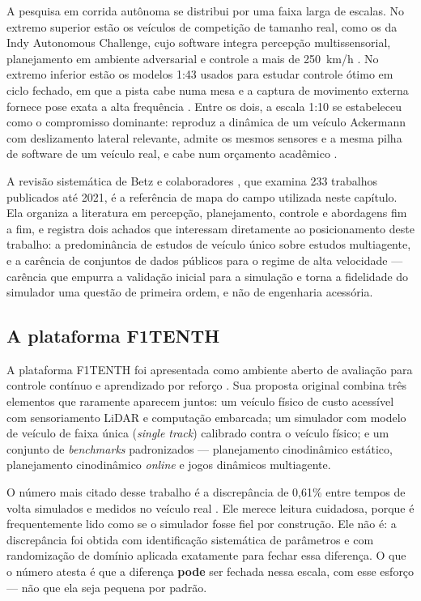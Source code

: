 A pesquisa em corrida autônoma se distribui por uma faixa larga de escalas. No
extremo superior estão os veículos de competição de tamanho real, como os da
Indy Autonomous Challenge, cujo software integra percepção multissensorial,
planejamento em ambiente adversarial e controle a mais de 250~km/h
\cite{Betz2023TUM}. No extremo inferior estão os modelos 1:43 usados para
estudar controle ótimo em ciclo fechado, em que a pista cabe numa mesa e a
captura de movimento externa fornece pose exata a alta frequência
\cite{Liniger2015Optimization}. Entre os dois, a escala 1:10 se estabeleceu como
o compromisso dominante: reproduz a dinâmica de um veículo Ackermann com
deslizamento lateral relevante, admite os mesmos sensores e a mesma pilha de
software de um veículo real, e cabe num orçamento acadêmico
\cite{Betz2022Survey}.

A revisão sistemática de Betz e colaboradores \cite{Betz2022Survey}, que examina
233 trabalhos publicados até 2021, é a referência de mapa do campo utilizada
neste capítulo. Ela organiza a literatura em percepção, planejamento, controle e
abordagens fim a fim, e registra dois achados que interessam diretamente ao
posicionamento deste trabalho: a predominância de estudos de veículo único sobre
estudos multiagente, e a carência de conjuntos de dados públicos para o regime de
alta velocidade --- carência que empurra a validação inicial para a simulação e
torna a fidelidade do simulador uma questão de primeira ordem, e não de
engenharia acessória.

\subsection{A plataforma F1TENTH}

A plataforma F1TENTH foi apresentada como ambiente aberto de avaliação para
controle contínuo e aprendizado por reforço \cite{OKelly2020F1TENTH}. Sua
proposta original combina três elementos que raramente aparecem juntos: um
veículo físico de custo acessível com sensoriamento LiDAR e computação
embarcada; um simulador com modelo de veículo de faixa única (\textit{single
track}) calibrado contra o veículo físico; e um conjunto de \textit{benchmarks}
padronizados --- planejamento cinodinâmico estático, planejamento cinodinâmico
\textit{online} e jogos dinâmicos multiagente.

O número mais citado desse trabalho é a discrepância de 0,61\% entre tempos de
volta simulados e medidos no veículo real \cite{OKelly2020F1TENTH}. Ele merece
leitura cuidadosa, porque é frequentemente lido como se o simulador fosse fiel
por construção. Ele não é: a discrepância foi obtida com identificação
sistemática de parâmetros e com randomização de domínio aplicada exatamente para
fechar essa diferença. O que o número atesta é que a diferença \textbf{pode} ser
fechada nessa escala, com esse esforço --- não que ela seja pequena por padrão.

